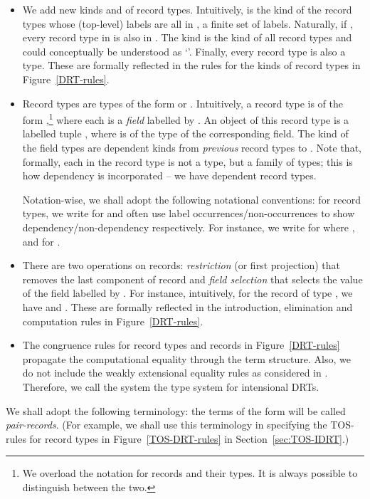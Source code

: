 \documentclass[submission,copyright,creativecommons]{eptcs}
\newcommand{\selfcomment}[1]{\ifodd 0 {\sf #1 }\fi}
\newcommand{\selfc}{\selfcomment}
\begin{document}
\begin{itemize}
  \item We add new kinds  and  of record types.  Intuitively,  is the kind of the record types whose (top-level) labels are all in , a finite set of labels.  Naturally, if , every record type in  is also in .  The kind  is the kind of all record types and could  conceptually be understood as `'.  Finally, every record type is also a type.  These are formally reflected in the rules for the kinds of record types in Figure~\ref{DRT-rules}.
  \item Record types are types of the form  or .  Intuitively, a record type is of the form ,\footnote{We overload the  notation for records and their types.  It is always possible to distinguish between the two.} where each  is a \emph{field} labelled by .  An object of this record type is a labelled tuple , where  is of the type of the corresponding field.  \selfc{The kind of the field types are dependent kinds from \emph{previous} record types to .}  Note that, formally, each  in the record type is not a type, but a family of types; this is how dependency is incorporated -- we have dependent record types.
      
      Notation-wise, we shall adopt the following notational conventions: for record types, we write  for  and often use label occurrences/non-occurrences to show dependency/non-dependency respectively.
For instance, we write  for  where , and  for .
  \item There are two operations on records: \emph{restriction} (or first projection)  that removes the last component of record  and \emph{field selection}  that selects the value of the field labelled by .  For instance, intuitively, for the record  of type , we have  and .  These are formally reflected in the introduction, elimination and computation rules in Figure~\ref{DRT-rules}.
  \item The congruence rules for record types and records in Figure~\ref{DRT-rules} propagate the computational equality through the term structure.  Also, we do not include the weakly extensional equality rules as considered in \cite{luo:TYPES08}.  Therefore, we call the system the type system for intensional DRTs.
\end{itemize}
We shall adopt the following terminology: the terms of the form  will be called \emph{pair-records}.  (For example, we shall use this terminology in specifying the TOS-rules for record types in Figure~\ref{TOS-DRT-rules} in Section~\ref{sec:TOS-IDRT}.)
\end{document}
